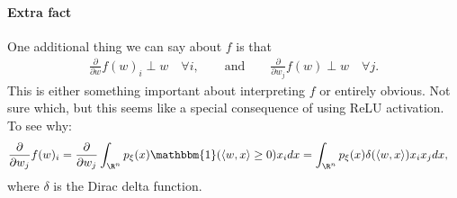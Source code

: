 \documentclass{article}
\begin{document}
\paragraph*{Extra fact}
One additional thing we can say about $f$ is that
\begin{align*}
  \frac{\partial}{\partial w} f(w)_i \perp w \quad \forall i,
  \qquad \text{and} \qquad
  \frac{\partial}{\partial w_j} f(w) \perp w \quad \forall j.
\end{align*}
This is either something important about interpreting $f$ or entirely obvious.
Not sure which, but this seems like a special consequence of using ReLU activation.
To see why:
\begin{align*}
  \frac{\partial}{\partial w_j} f(w)_i
  &= \frac{\partial}{\partial w_j} \int_{\R^n} p_{\xi}(x) \mathbbm{1}(\langle w, x \rangle \geq 0) x_i dx
  = \int_{\R^n} p_{\xi}(x) \delta(\langle w, x \rangle) x_i x_j dx,
\end{align*}
where $\delta$ is the Dirac delta function.
\end{document}
